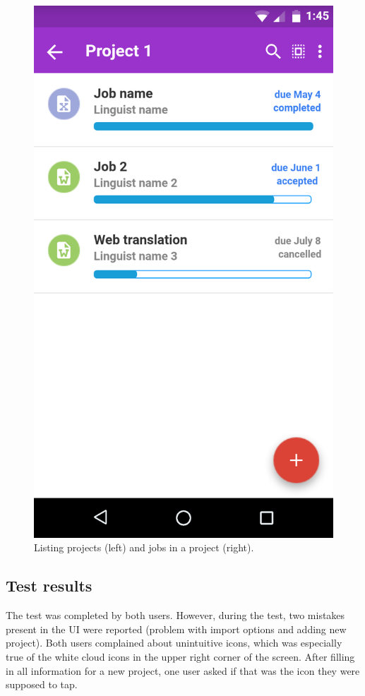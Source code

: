 \begin{figure}[]
\begin{minipage}{.5\textwidth}
	\end{minipage}%
	\begin{minipage}{.5\textwidth}
		\centering
		\includegraphics[width=.74\linewidth]{pics/protoProject1}
		
	\end{minipage}
	\caption{Listing projects (left) and jobs in a project (right).}
		\label{fig:proto}
\end{figure}


\subsection{Test results}

The test was completed by both users. However, during the test, two mistakes present in the UI were reported (problem with import options and adding new project). Both users complained about unintuitive icons, which was especially true of the white cloud icons in the upper right corner of the screen. After filling in all information for a new project, one user asked if that was the icon they were supposed to tap.

